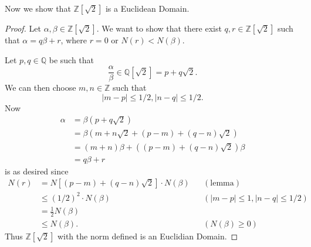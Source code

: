 \documentclass{article}
\theoremstyle{plain}
\newcommand{\Q}{\mathbb{Q}}
\newcommand{\Z}{\mathbb{Z}}
\begin{document}
Now we show that $\Z[\sqrt{2}]$ is a Euclidean Domain.
\begin{proof}
Let $\alpha,\beta\in\Z[\sqrt{2}]$. We want to show that there exist $q, r\in\Z[\sqrt{2}]$
such that $\alpha=q\beta+r$, where $r=0$ or $N(r)<N(\beta)$.

Let $p,q\in\Q$ be such that \[\frac{\alpha}{\beta}\in\Q[\sqrt{2}]=p+q\sqrt{2}.\]
We can then choose $m,n\in\Z$ such that
\[|m-p|\leq1/2, |n-q|\leq1/2.\]
Now \begin{align*}
      \alpha&=\beta(p+q\sqrt{2})\\
       &=\beta(m+n\sqrt{2}+(p-m)+(q-n)\sqrt{2})\\
       &=(m+n)\beta+((p-m)+(q-n)\sqrt{2})\beta\\
      &=q\beta+r
    \end{align*}
    is as desired since
    \begin{align*}
      N(r)&=N[(p-m)+(q-n)\sqrt{2}]\cdot N(\beta)&& (\text{lemma})\\
          &\leq(1/2)^{2}\cdot N(\beta)&&(|m-p|\leq1, |n-q|\leq1/2)\\
          &=\frac{1}{2}N(\beta)\\
          &\leq N(\beta). &&(N(\beta)\geq0)
    \end{align*}
Thus $\Z[\sqrt{2}]$ with the norm defined is an Euclidian Domain.
\end{proof}
\end{document}
